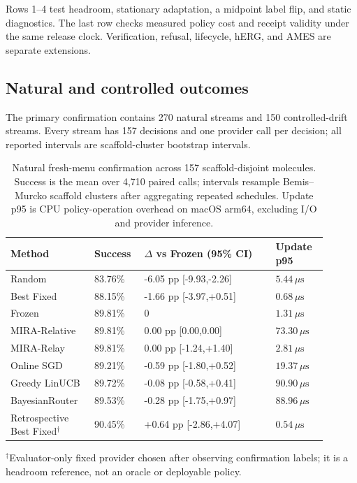 \documentclass[sigconf,anonymous]{aamas}
\begin{document}
Rows 1--4 test headroom, stationary adaptation, a midpoint label flip, and static diagnostics. The last row checks measured policy cost and receipt validity under the same release clock. Verification, refusal, lifecycle, hERG, and AMES are separate extensions.

\subsection{Natural and controlled outcomes}
The primary confirmation contains 270 natural streams and 150 controlled-drift streams. Every stream has 157 decisions and one provider call per decision; all reported intervals are scaffold-cluster bootstrap intervals.

\begin{table}[H]
\vspace{-6pt}
\caption{Natural fresh-menu confirmation across 157 scaffold-disjoint molecules. Success is the mean over 4,710 paired calls; intervals resample Bemis--Murcko scaffold clusters after aggregating repeated schedules. Update p95 is CPU policy-operation overhead on macOS arm64, excluding I/O and provider inference.}
\label{tab:main-results}
\footnotesize
{\setlength{\tabcolsep}{2.0pt}
\begin{tabular}{@{}P{0.24\linewidth}P{0.13\linewidth}P{0.38\linewidth}P{0.15\linewidth}@{}}
\toprule
Method & Success & $\Delta$ vs Frozen (95\% CI) & Update p95 \\
\midrule
Random & 83.76\% & -6.05 pp [-9.93,-2.26] & $5.44\,\mu\mathrm{s}$ \\
Best Fixed & 88.15\% & -1.66 pp [-3.97,+0.51] & $0.68\,\mu\mathrm{s}$ \\
Frozen & 89.81\% & 0 & $1.31\,\mu\mathrm{s}$ \\
MIRA-Relative & 89.81\% & 0.00 pp [0.00,0.00] & $73.30\,\mu\mathrm{s}$ \\
MIRA-Relay & 89.81\% & 0.00 pp [-1.24,+1.40] & $2.81\,\mu\mathrm{s}$ \\
Online SGD & 89.21\% & -0.59 pp [-1.80,+0.52] & $19.37\,\mu\mathrm{s}$ \\
Greedy LinUCB & 89.72\% & -0.08 pp [-0.58,+0.41] & $90.90\,\mu\mathrm{s}$ \\
BayesianRouter & 89.53\% & -0.28 pp [-1.75,+0.97] & $88.96\,\mu\mathrm{s}$ \\
Retrospective Best Fixed$^{\dagger}$ & 90.45\% & +0.64 pp [-2.86,+4.07] & $0.54\,\mu\mathrm{s}$ \\
\bottomrule
\end{tabular}}
\begin{flushleft}
\footnotesize $^{\dagger}$Evaluator-only fixed provider chosen after observing confirmation labels; it is a headroom reference, not an oracle or deployable policy.
\end{flushleft}
\end{table}
\end{document}
